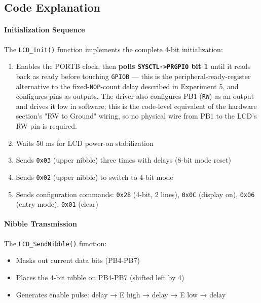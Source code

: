 
\pagestyle{plain} %
\subsection{Code Explanation}

\paragraph{Initialization Sequence}
The \texttt{LCD\_Init()} function implements the complete 4-bit initialization:
\begin{enumerate}[nosep]
  \item Enables the PORTB clock, then \textbf{polls \texttt{SYSCTL->PRGPIO} bit 1} until it reads back as ready before touching \texttt{GPIOB} — this is the peripheral-ready-register alternative to the fixed-\texttt{NOP}-count delay described in Experiment 5, and configures pins as outputs. The driver also configures PB1 (\texttt{RW}) as an output and drives it low in software; this is the code-level equivalent of the hardware section's "RW to Ground" wiring, so no physical wire from PB1 to the LCD's RW pin is required.
  \item Waits 50 ms for LCD power-on stabilization
  \item Sends \texttt{0x03} (upper nibble) three times with delays (8-bit mode reset)
  \item Sends \texttt{0x02} (upper nibble) to switch to 4-bit mode
  \item Sends configuration commands: \texttt{0x28} (4-bit, 2 lines), \texttt{0x0C} (display on), \texttt{0x06} (entry mode), \texttt{0x01} (clear)
\end{enumerate}

\paragraph{Nibble Transmission}
The \texttt{LCD\_SendNibble()} function:
\begin{itemize}[nosep]
  \item Masks out current data bits (PB4-PB7)
  \item Places the 4-bit nibble on PB4-PB7 (shifted left by 4)
  \item Generates enable pulse: delay → E high → delay → E low → delay
\end{itemize}

